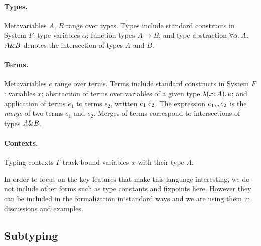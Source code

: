\paragraph{Types.} Metavariables $A$, $B$ range over types. Types include
standard constructs in System $F$: type variables $\alpha$; function types $A
\to B$; and type abstraction $\forall \alpha.\, A$. $A \& B$ denotes the
intersection of types $A$ and $B$.

\paragraph{Terms.} Metavariables $e$ range over terms.  Terms include standard
constructs in System $F$: variables $x$; abstraction of terms over variables of
a given type $\lambda (x \!:\! A).\, e$; and application of terms $e_1$ to terms $e_2$, written
$e_1 \; e_2$. The expression $e_1 ,, e_2$ is the
\emph{merge} of two terms $e_1$ and $e_2$.
Merges of terms correspond to intersections of types $A \& B$.

\paragraph{Contexts.} Typing contexts $ \Gamma $ track bound variables $x$ with their type $A$.


In order to focus on the key features that make this language interesting, we do
not include other forms such as type constants
and fixpoints here. However they can be included in the formalization in
standard ways and we are using them in discussions and examples.


\subsection{Subtyping}

